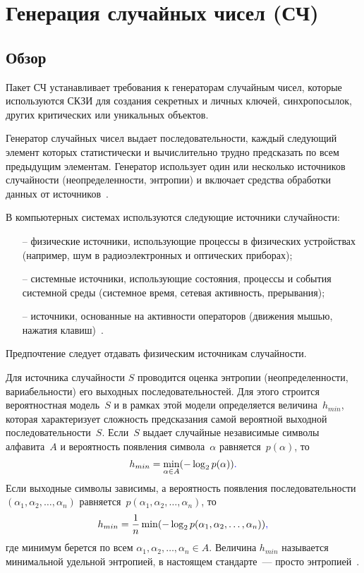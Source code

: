 \section{Генерация случайных чисел (СЧ)}\label{RN}

\subsection{Обзор}\label{RN.Intro}

Пакет СЧ устанавливает требования к генераторам случайным чисел, которые
используются СКЗИ для создания секретных и личных ключей, синхропосылок, других
критических или уникальных объектов.

Генератор случайных чисел выдает последовательности, каждый следующий элемент
которых статистически и вычислительно трудно предсказать по всем предыдущим
элементам.
%
Генератор использует один или несколько источников случайности
(неопределенности, энтропии) и включает средства обработки данных от 
источников~.

В компьютерных системах используются следующие источники случайности: 
\begin{itemize}
\item[--]
физические источники, использующие процессы в физических устройствах (например,
шум в радиоэлектронных и оптических приборах);

\item[--]
системные источники, использующие состояния, процессы и события системной среды
(системное время, сетевая активность, прерывания);

\item[--]
источники, основанные на активности операторов (движения мышью, нажатия 
клавиш)~.
\end{itemize}

Предпочтение следует отдавать физическим источникам случайности.

Для источника случайности $S$ проводится оценка энтропии (неопределенности,
вариабельности) его выходных последовательностей. Для этого строится
вероятностная модель~$S$ и в рамках этой модели определяется величина~$h_{min}$,
которая характеризует сложность предсказания самой вероятной выходной 
последовательности~$S$.  
%
Если~$S$ выдает случайные независимые символы алфавита~$A$ и
вероятность появления символа~$\alpha$ равняется~$p(\alpha)$, то
\begin{equation}\label{Eq.RN.1}
h_{min}=\min_{\alpha\in A}(-\log_2 p(\alpha))\textcolor{blue}{.}
\end{equation}
Если выходные символы зависимы, а вероятность появления 
последовательности $(\alpha_1,\alpha_2,\ldots,\alpha_n)$ 
равняется~$p(\alpha_1,\alpha_2,\ldots,\alpha_n)$, 
то
\begin{equation}\label{Eq.RN.2}
h_{min}=\frac{1}{n}\min(-\log_2 
p(\alpha_1,\alpha_2,\ldots,\alpha_n))\textcolor{blue}{,}
\end{equation}
где минимум берется по всем $\alpha_1,\alpha_2,\ldots,\alpha_n\in A$.
%
Величина $h_{min}$ называется минимальной удельной энтропией,
в настоящем стандарте~--- просто энтропией~.

